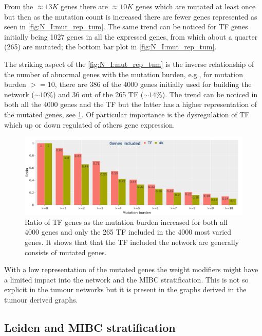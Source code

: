 From the $\approx13K$ genes there are $\approx10K$ genes which are mutated at least once but then as the mutation count is increased there are fewer genes represented as seen in \cref{fig:N_I:mut_rep_tum}. The same trend can be noticed for TF genes initially being 1027 genes in all the expressed genes, from which about a quarter (265) are mutated; the bottom bar plot in \cref{fig:N_I:mut_rep_tum}.

The striking aspect of the \cref{fig:N_I:mut_rep_tum} is the inverse relationship of the number of abnormal genes with the mutation burden, e.g., for mutation burden $>=10$, there are 386 of the 4000 genes initially used for building the network ($\sim10\%$) and 36 out of the 265 TF ($\sim14\%$). The trend can be noticed in both all the 4000 genes and the TF but the latter has a higher representation of the mutated genes, see \cref{fig:N_I:prct_mut_rep_tum}. Of particular importance is the dysregulation of TF which up or down regulated of others gene expression.

\begin{figure}[!htb]    
    \centering
    \includegraphics[width=1.0\textwidth,keepaspectratio]{Sections/Network_I/Resources/Tum_network/MutTF_representation_4K_TF_prct.png}
    \caption[Ratio of TF genes included by ModCon as mutation burden increases]{Ratio of TF genes as the mutation burden increased for both all 4000 genes and only the 265 TF included in the 4000 most varied genes. It shows that that the TF included the network are generally consists of mutated genes.}
    \label{fig:N_I:prct_mut_rep_tum}
\end{figure}

With a low representation of the mutated genes the weight modifiers might have a limited impact into the network and the MIBC stratification. This is not so explicit in the tumour networks but it is present in the graphs derived in the tumour derived graphs.

\subsection{Leiden and MIBC stratification} \label{s:N_I:tum_stratification}

